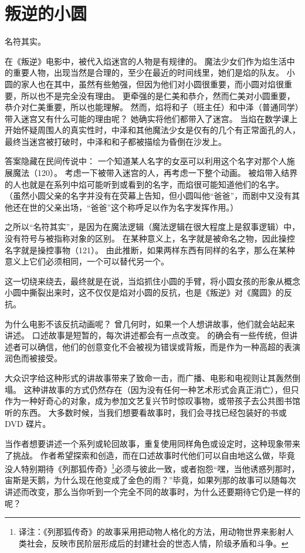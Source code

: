 \chapter{叛逆的小圆}
名符其实。

在《叛逆》电影中，被代入焰迷宫的人物是有规律的。
魔法少女们作为焰生活中的重要人物，出现当然是合理的，至少在最近的时间线里，她们是焰的队友。
小圆的家人也在其中，虽然有些勉强，但因为他们对小圆很重要，而小圆对焰很重要，所以也不是完全没有理由。
更牵强的是仁美和恭介，然而仁美对小圆重要，恭介对仁美重要，所以也能理解。
然而，焰将和子（班主任）和中泽（普通同学）带入迷宫又有什么可能的理由呢？
她确实将他们都带入了迷宫。
当焰在数学课上开始怀疑周围人的真实性时，中泽和其他魔法少女是仅有的几个有正常面孔的人，最终当迷宫被打破时，中泽和和子都被描绘为昏倒在沙发上。

答案隐藏在民间传说中：
一个知道某人名字的女巫可以利用这个名字对那个人施展魔法（120）。
考虑一下被带入迷宫的人，再考虑一下整个动画。
被焰带入结界的人也就是在系列中焰可能听到或看到的名字，而焰很可能知道他们的名字。
（虽然小圆父亲的名字并没有在荧幕上告知，但小圆叫他“爸爸”，而剧中又没有其他还在世的父亲出场，“爸爸”这个称呼足以作为名字发挥作用。）

之所以“名符其实”，是因为在魔法逻辑（魔法逻辑在很大程度上是叙事逻辑）中，没有符号与被指称对象的区别。
在某种意义上，名字就是被命名之物，因此操控名字就是操控事物（121）。
由此推断，如果两样东西有同样的名字，那么在某种意义上它们必须相同，一个可以替代另一个。

这一切绕来绕去，最终就是在说，当焰抓住小圆的手臂，将小圆女孩的形象从概念小圆中撕裂出来时，这不仅仅是焰对小圆的反抗，也是《叛逆》对《魔圆》的反抗。

为什么电影不该反抗动画呢？
曾几何时，如果一个人想讲故事，他们就会站起来讲述。
口述故事是短暂的，每次讲述都会有一点改变。
的确会有一些传统，但讲述者可以确信，他们的创意变化不会被视为错误或背叛，而是作为一种高超的表演润色而被接受。

大众识字给这种形式的讲故事带来了致命一击，而广播、电影和电视则让其轰然倒塌。
这种讲故事的方式仍然存在（因为没有任何一种艺术形式会真正消亡），但只作为一种好奇心的对象，成为参加文艺复兴节时惊叹事物，或带孩子去公共图书馆听的东西。
大多数时候，当我们想要看故事时，我们会寻找已经包装好的书或 DVD 碟片。

当作者想要讲述一个系列或轮回故事，重复使用同样角色或设定时，这种现象带来了挑战。
作者希望探索和创造，而在口述故事时代他们可以自由地这么做，毕竟没人特别期待《列那狐传奇》\footnote{%
    译注：《列那狐传奇》的故事采用把动物人格化的方法，用动物世界来影射人类社会，反映市民阶层形成后的封建社会的世态人情，阶级矛盾和斗争。
}必须与彼此一致，或者抱怨“嘿，当他诱惑列那时，宙斯是天鹅，为什么现在他变成了金色的雨？”毕竟，如果列那的故事可以随每次讲述而改变，那么当你听到一个完全不同的故事时，为什么还要期待它仍是一样的呢？

